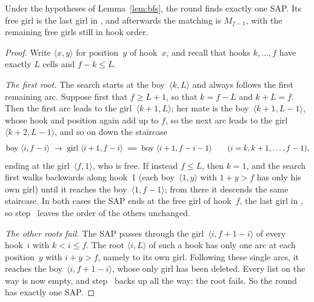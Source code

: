 \begin{lemma}
\label{lem:dfs}
Under the hypotheses of Lemma~\ref{lem:bfs}, the round finds exactly one
SAP. Its free girl is the last girl in , and afterwards the matching
is $M_{f-1}$, with the remaining free girls still in hook order.
\end{lemma}

\begin{proof}
Write $\langle x,y\rangle$ for position~$y$ of hook~$x$, and recall that hooks
$k,\ldots,f$ have exactly $L$ cells and $f-k\le L$.

\emph{The first root.} The search starts at the boy~$\langle k,L\rangle$ and always
follows the first remaining arc. Suppose first that $f\ge L+1$, so that
$k=f-L$ and $k+L=f$. Then the first arc leads to the girl~$\langle k+1,L\rangle$; her
mate is the boy~$\langle k+1,L-1\rangle$, whose hook and position again add up to $f$,
so the next arc leads to the girl~$\langle k+2,L-1\rangle$, and so on down the
staircase
\[
   \text{boy }\langle i,f-i\rangle\ \to\ \text{girl }\langle i+1,f-i\rangle\ \db\ \text{boy }\langle i+1,f-i-1\rangle
   \qquad(i=k,k+1,\ldots,f-1),
\]
ending at the girl~$\langle f,1\rangle$, who is free. If instead $f\le L$, then $k=1$,
and the search first walks backwards along hook~1 (each boy~$\langle 1,y\rangle$ with
$1+y>f$ has only his own girl) until it reaches the boy~$\langle 1,f-1\rangle$; from
there it descends the same staircase. In both cases the SAP ends at the
free girl of hook~$f$, the last girl in , so step~ leaves the
order of the others unchanged.

\emph{The other roots fail.} The SAP passes through the girl~$\langle i,f+1-i\rangle$
of every hook~$i$ with $k<i\le f$. The root $\langle i,L\rangle$ of such a hook has only
one arc at each position~$y$ with $i+y>f$, namely to its own girl. Following
these single arcs, it reaches the boy~$\langle i,f+1-i\rangle$, whose only girl has been
deleted. Every list on the way is now empty, and step~ backs up all
the way: the root fails. So the round has exactly one SAP.


\end{proof}
